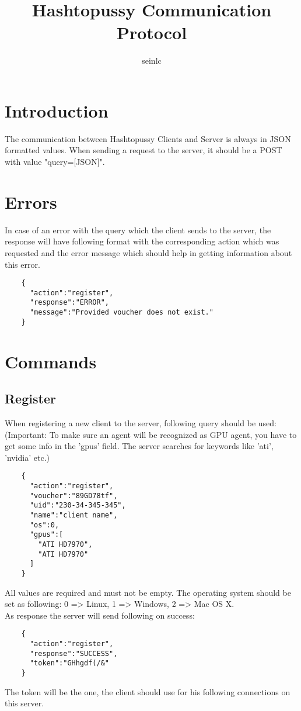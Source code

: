 \documentclass{article}
\author{seinlc}
\begin{document}
	\title{Hashtopussy Communication Protocol}
	\maketitle
	\section*{Introduction}
	The communication between Hashtopussy Clients and Server is always in JSON formatted values. When sending a request to the server, it should be a POST with value
	"query=[JSON]".

	\section*{Errors}
	In case of an error with the query which the client sends to the server, the response will have following format with the corresponding action which was requested and the error message which should help in getting information about this error.
	\begin{verbatim}
	{
	  "action":"register",
	  "response":"ERROR",
	  "message":"Provided voucher does not exist."
	}
	\end{verbatim}
	\pagebreak
	\section*{Commands}

	\subsection*{Register}
	When registering a new client to the server, following query should be used:
	(Important: To make sure an agent will be recognized as GPU agent, you have to get some info in the 'gpus' field. The server searches for keywords like 'ati', 'nvidia' etc.)
	\begin{verbatim}
	{
	  "action":"register",
	  "voucher":"89GD78tf",
	  "uid":"230-34-345-345",
	  "name":"client name",
	  "os":0,
	  "gpus":[
	    "ATI HD7970",
	    "ATI HD7970"
	  ]
	}
	\end{verbatim}
	All values are required and must not be empty. The operating system should be set as following: 0 => Linux, 1 => Windows, 2 => Mac OS X.\\
	As response the server will send following on success:
	\begin{verbatim}
	{
	  "action":"register",
	  "response":"SUCCESS",
	  "token":"GHhgdf(/&"
	} 
	\end{verbatim}
	The token will be the one, the client should use for his following connections on this server.
	
\end{document}
